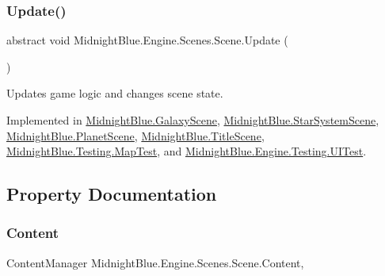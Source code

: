 \subsubsection{\texorpdfstring{Update()}{Update()}}
{\footnotesize\ttfamily abstract void Midnight\+Blue.\+Engine.\+Scenes.\+Scene.\+Update (\begin{DoxyParamCaption}{ }\end{DoxyParamCaption})\hspace{0.3cm}{\ttfamily [pure virtual]}}



Updates game logic and changes scene state. 



Implemented in \hyperlink{class_midnight_blue_1_1_galaxy_scene_a9dfa66406143ed20f4d534c768f05a78}{Midnight\+Blue.\+Galaxy\+Scene}, \hyperlink{class_midnight_blue_1_1_star_system_scene_ac36506b721064e015a9f93140681d93a}{Midnight\+Blue.\+Star\+System\+Scene}, \hyperlink{class_midnight_blue_1_1_planet_scene_add0a85b4f754f026231aa7269259c65c}{Midnight\+Blue.\+Planet\+Scene}, \hyperlink{class_midnight_blue_1_1_title_scene_a4052b2a261434462cd0150e2f4da3c5b}{Midnight\+Blue.\+Title\+Scene}, \hyperlink{class_midnight_blue_1_1_testing_1_1_map_test_ae4bb817dd9c5b55bd1d818de9f527c7c}{Midnight\+Blue.\+Testing.\+Map\+Test}, and \hyperlink{class_midnight_blue_1_1_engine_1_1_testing_1_1_u_i_test_a9866becb1e9b6bf9b9edb0f732b46250}{Midnight\+Blue.\+Engine.\+Testing.\+U\+I\+Test}.



\subsection{Property Documentation}
\hypertarget{class_midnight_blue_1_1_engine_1_1_scenes_1_1_scene_ad331b8ccde470e0a1b13b50e53e5fa58}{}\label{class_midnight_blue_1_1_engine_1_1_scenes_1_1_scene_ad331b8ccde470e0a1b13b50e53e5fa58} 
\subsubsection{\texorpdfstring{Content}{Content}}
{\footnotesize\ttfamily Content\+Manager Midnight\+Blue.\+Engine.\+Scenes.\+Scene.\+Content\hspace{0.3cm}{\ttfamily [get]}, {\ttfamily [protected]}}



